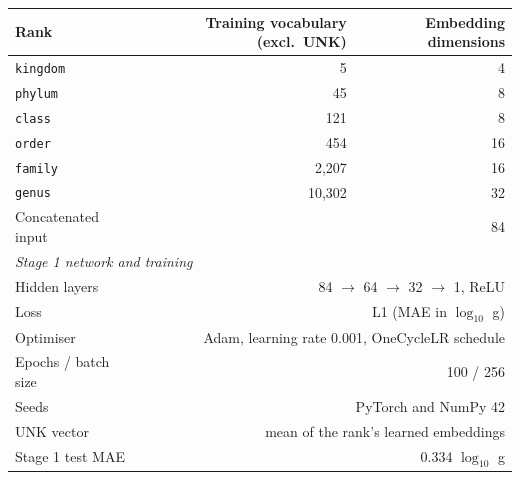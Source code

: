 \begin{tabular}{lrr}
\toprule
Rank & Training vocabulary (excl.\ UNK) & Embedding dimensions \\
\midrule
\texttt{kingdom} & 5 & 4 \\
\texttt{phylum} & 45 & 8 \\
\texttt{class} & 121 & 8 \\
\texttt{order} & 454 & 16 \\
\texttt{family} & 2{,}207 & 16 \\
\texttt{genus} & 10{,}302 & 32 \\
Concatenated input & & 84 \\
\midrule
\multicolumn{3}{l}{\textit{Stage 1 network and training}} \\
Hidden layers & \multicolumn{2}{r}{84 $\rightarrow$ 64 $\rightarrow$ 32 $\rightarrow$ 1, ReLU} \\
Loss & \multicolumn{2}{r}{L1 (MAE in $\log_{10}$ g)} \\
Optimiser & \multicolumn{2}{r}{Adam, learning rate 0.001, OneCycleLR schedule} \\
Epochs / batch size & \multicolumn{2}{r}{100 / 256} \\
Seeds & \multicolumn{2}{r}{PyTorch and NumPy 42} \\
UNK vector & \multicolumn{2}{r}{mean of the rank's learned embeddings} \\
Stage 1 test MAE & \multicolumn{2}{r}{0.334 $\log_{10}$ g} \\
\bottomrule
\end{tabular}
